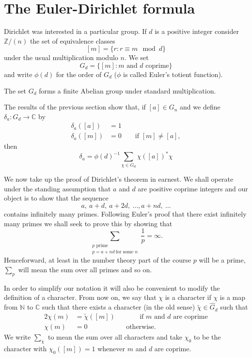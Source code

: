 \section{The Euler-Dirichlet formula} Dirichlet was interested
in a particular group. If $d$ is a positive integer consider
${\mathbb Z}/(n)$ the set of equivalence classes
\[[m]=\{r:r\equiv m \mod{d}\}\]
under the usual multiplication modulo $n$.
We set
\[G_{d}=\{[m]:\text{$m$ and $d$ coprime}\}\]
and write $\phi(d)$ for the order of $G_{d}$ ($\phi$ is
called Euler's totient function).
\begin{lemma} The set $G_{d}$ forms a finite
Abelian group under
standard multiplication.
\end{lemma}
The results of the previous section show that, if $[a]\in G_{n}$
and we define $\delta_{a}:G_{d}\rightarrow{\mathbb C}$ by
\begin{align*}
\delta_{a}([a])&=1\\
\delta_{a}([m])&=0\qquad \text{if $[m]\neq [a]$},
\end{align*}
then
\[\delta_{a}=\phi(d)^{-1}\sum_{\chi\in G_{d}}\chi([a])^{*}\chi\]

We now take up the proof of Dirichlet's theorem in earnest.
We shall operate under the standing assumption that $a$ and $d$  
are positive coprime integers and our object is to show
that the sequence
\[a,\ a+d,\ a+2d,\ \dots, a+nd,\ \dots\]
contains infinitely many primes. Following
Euler's proof that there exist infinitely many primes
we shall seek to prove this by showing that
\[\sum_{\substack{\text{$p$ prime}\\p=a+nd\ \text{for some $n$}}}
\frac{1}{p}=\infty.\]
Henceforward, at least in the number theory part of the 
course $p$ will be a prime,  $\sum_{p}$ will mean the
sum over all primes and so on.

In order to simplify our notation it will also be convenient
to modify the definition of a character. From now on, we say
that $\chi$ is a character if $\chi$ is a map from
${\mathbb N}$ to ${\mathbb C}$ such that there exists a character
(in the old sense) $\tilde{\chi}\in \hat{G}_{d}$
such that
\begin{alignat*}{2}
\chi(m)&=\tilde{\chi}([m])&&\qquad\text{if $m$ and $d$ are coprime}\\
\chi(m)&=0&&\text{otherwise}.
\end{alignat*}
We write $\sum_{\chi}$ to mean the sum over all characters
and take $\chi_{0}$ to be the character with
$\chi_{0}([m])=1$ whenever $m$ and $d$ are coprime.

